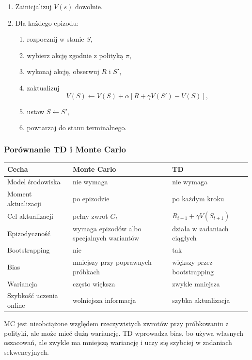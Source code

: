 \begin{enumerate}
  \item Zainicjalizuj $V(s)$ dowolnie.
  \item Dla każdego epizodu:
  \begin{enumerate}
    \item rozpocznij w stanie $S$,
    \item wybierz akcję zgodnie z polityką $\pi$,
    \item wykonaj akcję, obserwuj $R$ i $S'$,
    \item zaktualizuj
    \[
    V(S)\leftarrow V(S)+\alpha\left[R+\gamma V(S')-V(S)\right],
    \]
    \item ustaw $S\leftarrow S'$,
    \item powtarzaj do stanu terminalnego.
  \end{enumerate}
\end{enumerate}

\subsubsection{Porównanie TD i Monte Carlo}

\begin{longtable}{p{}p{}p{}}
\toprule
Cecha & Monte Carlo & TD \\
\midrule
Model środowiska & nie wymaga & nie wymaga \\
Moment aktualizacji & po epizodzie & po każdym kroku \\
Cel aktualizacji & pełny zwrot $G_t$ & $R_{t+1}+\gamma V(S_{t+1})$ \\
Epizodyczność & wymaga epizodów albo specjalnych wariantów & działa w zadaniach ciągłych \\
Bootstrapping & nie & tak \\
Bias & mniejszy przy poprawnych próbkach & większy przez bootstrapping \\
Wariancja & często większa & zwykle mniejsza \\
Szybkość uczenia online & wolniejsza informacja & szybka aktualizacja \\
\bottomrule
\end{longtable}

MC jest nieobciążone względem rzeczywistych zwrotów przy próbkowaniu z polityki, ale może mieć dużą wariancję. TD wprowadza bias, bo używa własnych oszacowań, ale zwykle ma mniejszą wariancję i uczy się szybciej w zadaniach sekwencyjnych.

